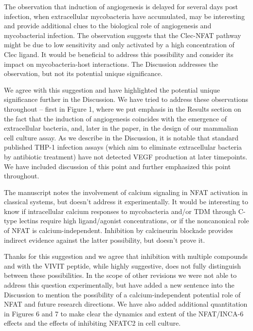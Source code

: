\begin{description}[style=multiline, labelwidth=\widthof{Reviewer \#2:   }, font=\normalfont, leftmargin=\labelwidth, align=right]
\item[Reviewer \#1: ] \quad The observation that induction of angiogenesis is delayed for several days post infection, when extracellular mycobacteria have accumulated, may be interesting and provide additional clues to the biological role of angiogenesis and mycobacterial infection. The observation suggests that the Clec\hyp{}NFAT pathway might be due to low sensitivity and only activated by a high concentration of Clec ligand. It would be beneficial to address this possibility and consider its impact on mycobacteria\hyp{}host interactions. The Discussion addresses the observation, but not its potential unique significance.

\item[Response: ] \quad We agree with this suggestion and have highlighted the potential unique significance further in the Discussion. We have tried to address these observations throughout – first in Figure 1, where we put emphasis in the Results section on the fact that the induction of angiogenesis coincides with the emergence of extracellular bacteria, and, later in the paper, in the design of our mammalian cell culture assay. As we describe in the Discussion, it is notable that standard published THP\hyp{}1 infection assays (which aim to eliminate extracellular bacteria by antibiotic treatment) have not detected VEGF production at later timepoints. We have included discussion of this point and further emphasized this point throughout. 

\item[Reviewer \#1: ] \quad The manuscript notes the involvement of calcium signaling in NFAT activation in classical systems, but doesn’t address it experimentally. It would be interesting to know if intracellular calcium responses to mycobacteria and/or TDM through C\hyp{}type lectins require high ligand/agonist concentrations, or if the noncanonical role of NFAT is calcium\hyp{}independent. Inhibition by calcineurin blockade provides indirect evidence against the latter possibility, but doesn’t prove it.

\item[Response: ] \quad Thanks for this suggestion and we agree that inhibition with multiple compounds and with the VIVIT peptide, while highly suggestive, does not fully distinguish between these possibilities. In the scope of other revisions we were not able to address this question experimentally, but have added a new sentence into the Discussion to mention the possibility of a calcium\hyp{}independent potential role of NFAT and future research directions. We have also added additional quantitation in Figures 6 and 7 to make clear the dynamics and extent of the NFAT/INCA\hyp{}6 effects and the effects of inhibiting NFATC2 in cell culture.


\end{description}
